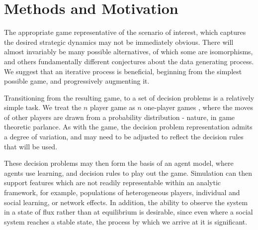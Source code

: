 \section{Methods and Motivation}
\label{sec:model_design}

The appropriate game representative of the scenario of interest, which captures the desired strategic dynamics may not be immediately obvious. There will almost invariably be many possible alternatives, of which some are isomorphisms, and others fundamentally different conjectures about the data generating process. We suggest that an iterative process is beneficial, beginning from the simplest possible game, and progressively augmenting it.

Transitioning from the resulting game, to a set of decision problems is a relatively simple task. We treat the $n$ player game as $n$ one-player games \citep{RiosInsua2009}, where the moves of other players are drawn from a probability distribution - nature, in game theoretic parlance. As with the game, the decision problem representation admits a degree of variation, and may need to be adjusted to reflect the decision rules that will be used.

These decision problems may then form the basis of an agent model, where agents use learning, and decision rules to play out the game. Simulation can then support features which are not readily representable within an analytic framework, for example, populations of heterogeneous players, individual and social learning, or network effects. In addition, the ability to observe the system in a state of flux rather than at equilibrium is desirable, since even where a social system reaches a stable state, the process by which we arrive at it is significant. 
